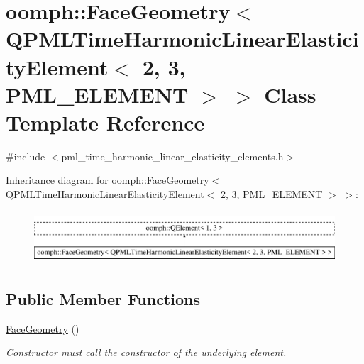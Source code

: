 \hypertarget{classoomph_1_1FaceGeometry_3_01QPMLTimeHarmonicLinearElasticityElement_3_012_00_013_00_01PML__ELEMENT_01_4_01_4}{}\section{oomph\+:\+:Face\+Geometry$<$ Q\+P\+M\+L\+Time\+Harmonic\+Linear\+Elasticity\+Element$<$ 2, 3, P\+M\+L\+\_\+\+E\+L\+E\+M\+E\+NT $>$ $>$ Class Template Reference}
\label{classoomph_1_1FaceGeometry_3_01QPMLTimeHarmonicLinearElasticityElement_3_012_00_013_00_01PML__ELEMENT_01_4_01_4}


{\ttfamily \#include $<$pml\+\_\+time\+\_\+harmonic\+\_\+linear\+\_\+elasticity\+\_\+elements.\+h$>$}

Inheritance diagram for oomph\+:\+:Face\+Geometry$<$ Q\+P\+M\+L\+Time\+Harmonic\+Linear\+Elasticity\+Element$<$ 2, 3, P\+M\+L\+\_\+\+E\+L\+E\+M\+E\+NT $>$ $>$\+:\begin{figure}[H]
\begin{center}
\leavevmode
\includegraphics[height=1.989343cm]{classoomph_1_1FaceGeometry_3_01QPMLTimeHarmonicLinearElasticityElement_3_012_00_013_00_01PML__ELEMENT_01_4_01_4}
\end{center}
\end{figure}
\subsection*{Public Member Functions}
\begin{DoxyCompactItemize}
\item 
\hyperlink{classoomph_1_1FaceGeometry_3_01QPMLTimeHarmonicLinearElasticityElement_3_012_00_013_00_01PML__ELEMENT_01_4_01_4_a7ebd108fe04847504ad0f475afb060f0}{Face\+Geometry} ()
\begin{DoxyCompactList}\small\item\em Constructor must call the constructor of the underlying element. \end{DoxyCompactList}\end{DoxyCompactItemize}


